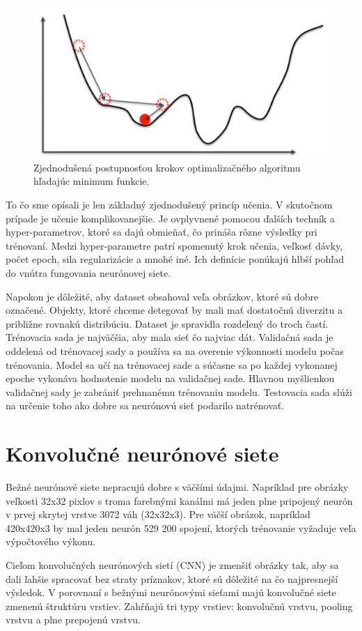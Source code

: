 \begin{figure}[h]
    \centering
    \includegraphics[width=.5\textwidth]{images/02/grad.png}
    \caption{Zjednodušená postupnosťou krokov optimalizačného algoritmu hľadajúc minimum funkcie. \cite{grad}}
    \label{img:gradient}
\end{figure}

To čo sme opísali je len základný zjednodušený princíp učenia. V skutočnom prípade je učenie komplikovanejšie. Je ovplyvnené pomocou ďalších techník a hyper-parametrov, ktoré sa dajú obmieňať, čo prináša rôzne výsledky pri trénovaní. Medzi hyper-parametre patrí spomenutý krok učenia, veľkosť dávky, počet epoch, sila regularizácie a mnohé iné. Ich definície ponúkajú hlbší pohľad do vnútra fungovania neurónovej siete.

Napokon je dôležité, aby dataset obsahoval veľa obrázkov, ktoré sú dobre označené. Objekty, ktoré chceme detegovať by mali mať dostatočnú diverzitu a približne rovnakú distribúciu. Dataset je spravidla rozdelený do troch častí. Trénovacia sada je najväčšia, aby mala sieť čo najviac dát. Validačná sada je oddelená od trénovacej sady a používa sa na overenie výkonnosti modelu počas trénovania. Model sa učí na trénovacej sade a súčasne sa po každej vykonanej epoche vykonáva hodnotenie modelu na validačnej sade. Hlavnou myšlienkou validačnej sady je zabrániť prehnanému trénovaniu modelu. Testovacia sada slúži na určenie toho ako dobre sa neurónovú sieť podarilo natrénovať.

\section{Konvolučné neurónové siete}

Bežné neurónové siete nepracujú dobre s väčšími údajmi. Napríklad pre obrázky veľkosti 32x32 pixlov s troma farebnými kanálmi má jeden plne pripojený neurón v prvej skrytej vrstve 3072 váh (32x32x3). Pre väčší obrázok, napríklad 420x420x3 by mal jeden neurón 529 200 spojení, ktorých trénovanie vyžaduje veľa výpočtového výkonu.

Cieľom konvolučných neurónových sietí (CNN) je zmenšiť obrázky tak, aby sa dali ľahšie spracovať bez straty príznakov, ktoré sú dôležité na čo najpresnejší výsledok. V porovnaní s bežnými neurónovými sieťami majú konvolučné siete zmenenú štruktúru vrstiev. Zahŕňajú tri typy vrstiev: konvolučnú vrstvu, pooling vrstvu a plne prepojenú vrstvu.

